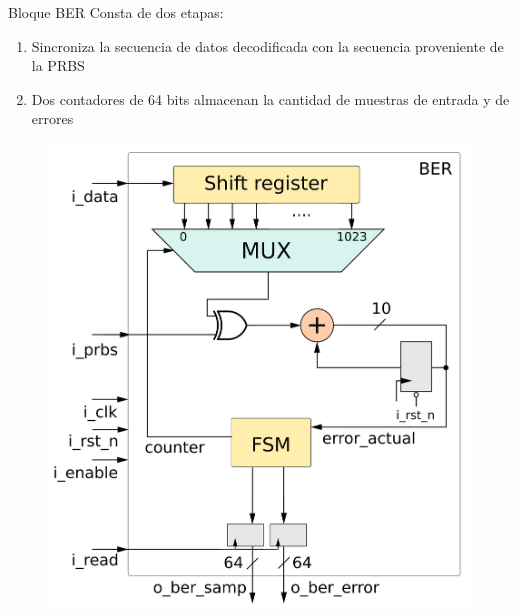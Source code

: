 \documentclass[xcolor=table]{beamer}
\begin{document}


\begin{frame}{Bloque BER}
Consta de dos etapas:
\begin{enumerate}
    \item Sincroniza la secuencia de datos decodificada con la secuencia proveniente de la PRBS
    \item  Dos contadores de 64 bits almacenan la cantidad de muestras de entrada y de errores
\end{enumerate}
 \begin{figure}
  \centering
  \includegraphics[height=0.60\paperheight]{Diagramas/ber.png}%
\end{figure}
\end{frame}
\end{document}
